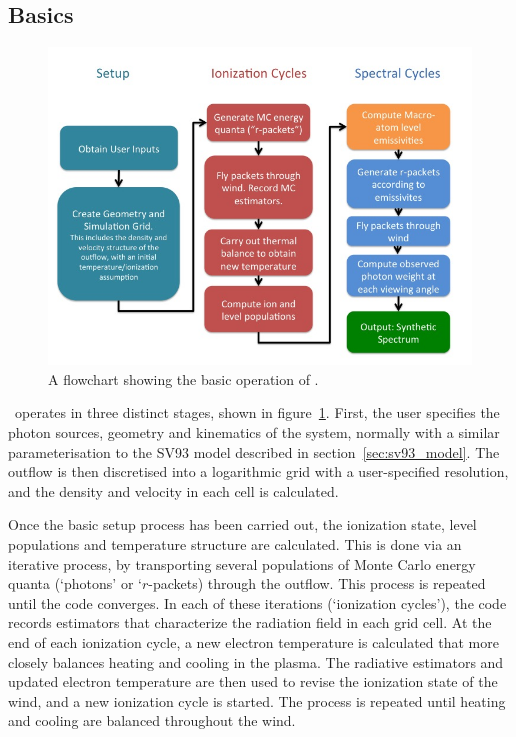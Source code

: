 \subsection{Basics}

\begin{figure}
\centering
\includegraphics[width=1.0\textwidth]{figures/04-radtrans/flowchart.jpg}
\caption
{
A flowchart showing the basic operation of \py.
} 
\label{fig:flowchart}
\end{figure}


\py\ operates in three distinct stages, shown in figure~\ref{fig:flowchart}. 
First, the user specifies the photon sources,
geometry and kinematics of the system, normally with a similar parameterisation
to the SV93 model described in section~\ref{sec:sv93_model}. The outflow
is then discretised into a logarithmic grid with a user-specified resolution,
and the density and velocity in each cell is calculated. 

Once the basic setup process has been carried out, the ionization state,
level populations and temperature structure are calculated.
This is done via an iterative process, by transporting several populations of 
Monte Carlo energy quanta (`photons' or `$r$-packets) through the outflow.
This process is repeated until the code converges. 
In each of these iterations (`ionization cycles'), the code records estimators that 
characterize the radiation field in each grid cell. At the end 
of each ionization cycle, a new electron temperature is calculated
that more closely balances heating and cooling in the 
plasma. The radiative estimators and updated electron
temperature are then used to revise the ionization state of the wind,
and a new ionization cycle is started. The process is repeated until
heating and cooling are balanced throughout the wind. 

